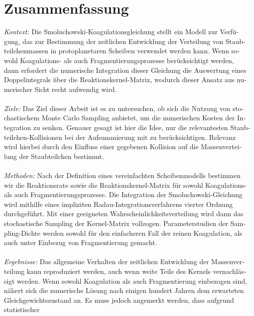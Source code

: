 \cleardoublepage\chapter*{Zusammenfassung}

\thispagestyle{NoHeader}

\begin{otherlanguage}{german}

\textit{Kontext:}
Die Smoluchowski-Koagulationsgleichung stellt ein Modell zur Verfügung, das zur Bestimmung der 
zeitlichen Entwicklung der Verteilung von Staubteilchenmassen in protoplanetaren Scheiben verwendet 
werden kann. Wenn sowohl Koagulations- als auch Fragmentierungsprozesse berücksichtigt werden, dann 
erfordert die numerische Integration dieser Gleichung die Auswertung eines Doppelintegrals über die 
Reaktionskernel-Matrix, wodurch dieser Ansatz aus numerischer Sicht recht aufwendig wird.
\\ \ \\
\textit{Ziele:}
Das Ziel dieser Arbeit ist es zu untersuchen, ob sich die Nutzung von stochastischem 
Monte Carlo Sampling anbietet, um die numerischen Kosten der Integration zu senken.
Genauer gesagt ist hier die Idee, nur die relevantesten Staubteilchen-Kollisionen 
bei der Aufsummierung mit zu berücksichtigen.
Relevanz wird hierbei durch den Einfluss einer gegebenen Kollision auf die Massenverteilung der 
Staubteilchen bestimmt.
\\ \ \\
\textit{Methoden:}
Nach der Definition eines vereinfachten Scheibenmodells bestimmen wir die Reaktionsrate sowie die 
Reaktionskernel-Matrix für sowohl Koagulations- als auch Fragmentierungsprozesse.
Die Integration der Smoluchowski-Gleichung wird mithilfe eines impliziten
Radau-Integrationsverfahrens vierter Ordnung durchgeführt. 
Mit einer geeigneten Wahrscheinlichkeitsverteilung wird dann das stochastische Sampling der 
Kernel-Matrix vollzogen. Parameterstudien der Sampling-Dichte werden sowohl für den 
einfacheren Fall der reinen Koagulation, als auch unter Einbezug von Fragmentierung gemacht.
\\ \ \\
\textit{Ergebnisse:}
Das allgemeine Verhalten der zeitlichen Entwicklung der Massenverteilung kann reproduziert werden, 
auch wenn weite Teile des Kernels vernachlässigt werden. Wenn sowohl Koagulation als auch 
Fragmentierung einbezogen sind, nähert sich die numerische Lösung nach einigen hundert Jahren dem
erwarteten Gleichgewichtszustand an. Es muss jedoch angemerkt werden, dass aufgrund statistischer

\end{otherlanguage}
